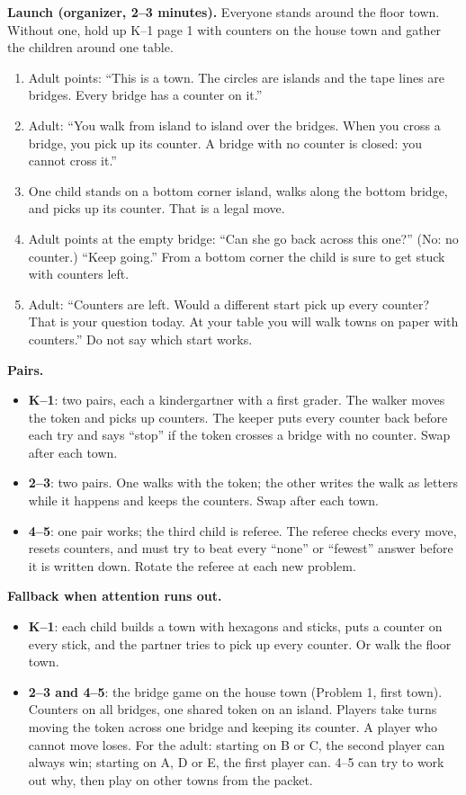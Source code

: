 \documentclass[10pt]{article}
\begin{document}
\textbf{Launch (organizer, 2--3 minutes).} Everyone stands around the floor town. Without one, hold up K--1 page 1 with counters on the house town and gather the children around one table.
\begin{enumerate}
\item Adult points: ``This is a town. The circles are islands and the tape lines are bridges. Every bridge has a counter on it.''
\item Adult: ``You walk from island to island over the bridges. When you cross a bridge, you pick up its counter. A bridge with no counter is closed: you cannot cross it.''
\item One child stands on a bottom corner island, walks along the bottom bridge, and picks up its counter. That is a legal move.
\item Adult points at the empty bridge: ``Can she go back across this one?'' (No: no counter.) ``Keep going.'' From a bottom corner the child is sure to get stuck with counters left.
\item Adult: ``Counters are left. Would a different start pick up every counter? That is your question today. At your table you will walk towns on paper with counters.'' Do not say which start works.
\end{enumerate}

\textbf{Pairs.}
\begin{itemize}
\item \textbf{K--1}: two pairs, each a kindergartner with a first grader. The walker moves the token and picks up counters. The keeper puts every counter back before each try and says ``stop'' if the token crosses a bridge with no counter. Swap after each town.
\item \textbf{2--3}: two pairs. One walks with the token; the other writes the walk as letters while it happens and keeps the counters. Swap after each town.
\item \textbf{4--5}: one pair works; the third child is referee. The referee checks every move, resets counters, and must try to beat every ``none'' or ``fewest'' answer before it is written down. Rotate the referee at each new problem.
\end{itemize}

\textbf{Fallback when attention runs out.}
\begin{itemize}
\item \textbf{K--1}: each child builds a town with hexagons and sticks, puts a counter on every stick, and the partner tries to pick up every counter. Or walk the floor town.
\item \textbf{2--3 and 4--5}: the bridge game on the house town (Problem 1, first town). Counters on all bridges, one shared token on an island. Players take turns moving the token across one bridge and keeping its counter. A player who cannot move loses. For the adult: starting on B or C, the second player can always win; starting on A, D or E, the first player can. 4--5 can try to work out why, then play on other towns from the packet.
\end{itemize}
\end{document}
